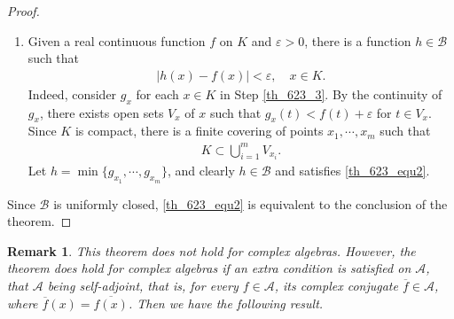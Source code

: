 \documentclass[11pt]{book}
\newtheorem{remark}{Remark}[chapter]
\theoremstyle{definition}
\numberwithin{equation}{chapter}
\begin{document}
\begin{proof}
\begin{enumerate}[label=(\Roman*)]
    \item Given a real continuous function $f$ on $K$ and $\varepsilon > 0$, there is a function $h \in \mathscr{B}$ such that
    \begin{align}\label{th_623_equ2}
        \left|h(x) - f(x)\right| < \varepsilon, \quad x \in K.
    \end{align}
    Indeed, consider $g_x$ for each $x \in K$ in Step \ref{th_623_3}. By the continuity of $g_x$, there exists open sets $V_x$ of $x$ such that $g_x(t) < f(t) + \varepsilon$ for $t \in V_x$. Since $K$ is compact, there is a finite covering of points $x_1, \cdots, x_m$ such that
    \begin{align*}
        K \subset \bigcup^m_{i=1} V_{x_i}.
    \end{align*}
    Let $h = \min \{g_{x_1}, \cdots, g_{x_m}\}$, and clearly $h \in \mathscr{B}$ and satisfies \eqref{th_623_equ2}.
\end{enumerate}
Since $\mathscr{B}$ is uniformly closed, \eqref{th_623_equ2} is equivalent to the conclusion of the theorem.
\end{proof}

\medskip

\begin{remark}
This theorem does not hold for complex algebras. However, the theorem does hold for complex algebras if an extra condition is satisfied on $\mathscr{A}$, that $\mathscr{A}$ being self-adjoint, that is, for every $f \in \mathscr{A}$, its complex conjugate $\overline{f} \in \mathscr{A}$, where $\overline{f}(x) = \overline{f(x)}$. Then we have the following result.
\end{remark}

\medskip
\end{document}
